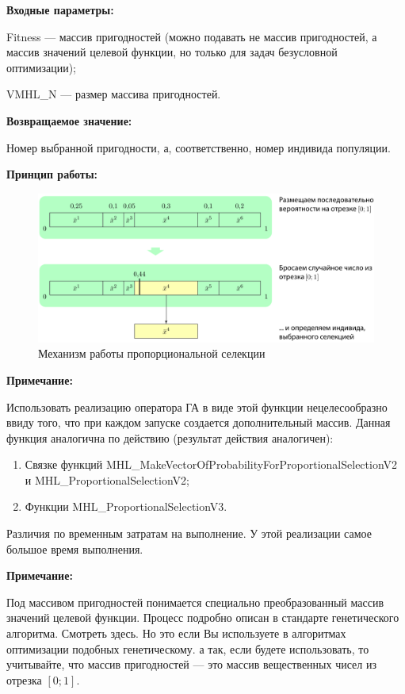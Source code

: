 \textbf{Входные параметры:}
 
 Fitness --- массив пригодностей (можно подавать не массив пригодностей, а массив значений целевой функции, но только для задач безусловной оптимизации);
  
 VMHL\_N --- размер массива пригодностей.

\textbf{Возвращаемое значение:} 

Номер выбранной пригодности, а, соответственно, номер индивида популяции.

 \textbf{Принцип работы:}

\begin{figure} [h]
  \center
  \includegraphics [scale=0.8] {MHL_ProportionalSelection_Sheme}
  \caption{Механизм работы пропорциональной селекции} 
  \label{img:MHL_ProportionalSelection_Sheme}  
\end{figure}

\textbf{Примечание:}

 Использовать реализацию оператора ГА в виде этой функции нецелесообразно ввиду того, что при каждом запуске создается дополнительный массив.  Данная функция аналогична по действию (результат действия аналогичен):
 
 \begin{enumerate}
\item Связке функций MHL\_MakeVectorOfProbabilityForProportionalSelectionV2 и MHL\_ProportionalSelectionV2;
\item Функции MHL\_ProportionalSelectionV3.
 \end{enumerate}
 
Различия по временным затратам на выполнение. У этой реализации самое большое время выполнения.
  
\textbf{Примечание:}

 Под массивом пригодностей понимается специально преобразованный массив значений целевой функции. Процесс подробно описан в стандарте генетического алгоритма. Смотреть здесь. Но это если Вы используете в алгоритмах оптимизации подобных генетическому. а так, если будете использовать, то учитывайте, что массив пригодностей --- это массив вещественных чисел из отрезка $[0;1]$.
